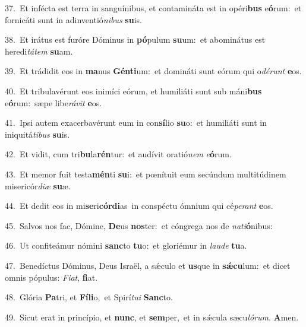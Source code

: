 {\numbfont\textcolor{\numbcolor}{37.}}~Et infécta est terra in sanguínibus, et contamináta est in opéri\textbf{bus} e\-\textbf{ó}\-rum:~\star et fornicáti sunt in adinventió\-\textit{ni}\-\textit{bus} \textbf{su}\-is.\par
{\numbfont\textcolor{\numbcolor}{38.}}~Et irátus est furóre Dóminus in \textbf{pó}\-pulum \textbf{su}\-um:~\star et abominátus est heredi\-\textit{tá}\-\textit{tem} \textbf{su}\-am.\par
{\numbfont\textcolor{\numbcolor}{39.}}~Et trádidit eos in \textbf{ma}\-nus \textbf{Gén}\-\textbf{ti}um:~\star et domináti sunt eórum qui o\-\textit{dé}\-\textit{runt} \textbf{e}\-os.\par
{\numbfont\textcolor{\numbcolor}{40.}}~Et tribulavérunt eos inimíci eórum, et humiliáti sunt sub máni\textbf{bus} e\-\textbf{ó}\-rum:~\star sæpe libe\-\textit{rá}\-\textit{vit} \textbf{e}\-os.\par
{\numbfont\textcolor{\numbcolor}{41.}}~Ipsi autem exacerbavérunt eum in con\-\textbf{sí}\-lio \textbf{su}\-o:~\star et humiliáti sunt in iniquitá\-\textit{ti}\-\textit{bus} \textbf{su}\-is.\par
{\numbfont\textcolor{\numbcolor}{42.}}~Et vidit, cum tri\-\textbf{bu}\-la\-\textbf{rén}\-tur:~\star et audívit oratió\textit{nem} \textit{e}\-\textbf{ó}rum.\par
{\numbfont\textcolor{\numbcolor}{43.}}~Et memor fuit testa\-\textbf{mén}\-ti \textbf{su}\-i:~\star et pœnítuit eum secúndum multitúdinem misericór\-\textit{di}\-\textit{æ} \textbf{su}\-æ.\par
{\numbfont\textcolor{\numbcolor}{44.}}~Et dedit eos in mi\-\textbf{se}\-ri\-\textbf{cór}\-\textbf{di}as~\star in conspéctu ómnium qui cé\-\textit{pe}\-\textit{rant} \textbf{e}\-os.\par
{\numbfont\textcolor{\numbcolor}{45.}}~Salvos nos fac, Dómine, \textbf{De}\-us \textbf{nos}\-ter:~\star et cóngrega nos de \textit{na}\-\textit{ti}\textbf{ó}nibus:\par
{\numbfont\textcolor{\numbcolor}{46.}}~Ut confiteámur nómini \textbf{sanc}\-to \textbf{tu}\-o:~\star et gloriémur in \textit{lau}\-\textit{de} \textbf{tu}\-a.\par
{\numbfont\textcolor{\numbcolor}{47.}}~Benedíctus Dóminus, Deus Israël, a sǽculo et \textbf{us}\-que in \textbf{sǽ}\-\textbf{cu}lum:~\star et dicet omnis pópulus: \textit{Fi}\-\textit{at}, \textbf{fi}\-at.\par
{\numbfont\textcolor{\numbcolor}{48.}}~Glória \textbf{Pa}\-tri, et \textbf{Fí}\-\textbf{li}o,~\star et Spirí\-\textit{tu}\-\textit{i} \textbf{Sanc}\-to.\par
{\numbfont\textcolor{\numbcolor}{49.}}~Sicut erat in princípio, et \textbf{nunc}\-, et \textbf{sem}\-per,~\star et in sǽcula sæcu\-\textit{ló}\-\textit{rum}. \textbf{A}\-men.\par
